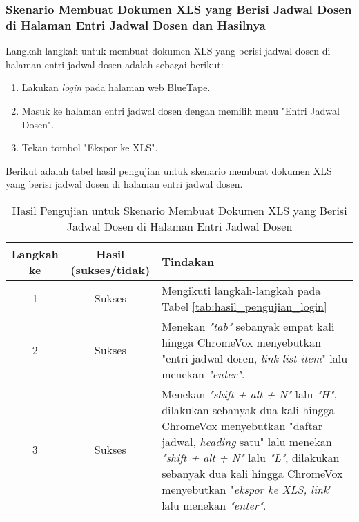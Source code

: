 \subsubsection{Skenario Membuat Dokumen XLS yang Berisi Jadwal Dosen di Halaman Entri Jadwal Dosen dan Hasilnya}
\label{subsubsec:skenario_membuat_dokumen_xls_yang_berisi_jadwal_dosen_di_halaman_entri_jadwal_dosen}
Langkah-langkah untuk membuat dokumen XLS yang berisi jadwal dosen di halaman entri jadwal dosen adalah sebagai berikut:

\begin{enumerate}
    \item Lakukan \textit{login} pada halaman web BlueTape.
    \item Masuk ke halaman entri jadwal dosen dengan memilih menu "Entri Jadwal Dosen".
    \item Tekan tombol "Ekspor ke XLS".
\end{enumerate}

Berikut adalah tabel hasil pengujian untuk skenario membuat dokumen XLS yang berisi jadwal dosen di halaman entri jadwal dosen.

\begin{table}[H]
    \centering 
    \caption{Hasil Pengujian untuk Skenario Membuat Dokumen XLS yang Berisi Jadwal Dosen di Halaman Entri Jadwal Dosen}
    \label{tab:hasil_pengujian_membuat_dokumen_xls_yang_berisi_jadwal_dosen_di_halaman_entri_jadwal_dosen}
    \begin{tabular}{|c|c|p{10cm}|}
        \toprule
        Langkah ke & Hasil (sukses/tidak) & Tindakan \\

        \midrule
        1 & Sukses & Mengikuti langkah-langkah pada Tabel \ref{tab:hasil_pengujian_login} \\
        2 & Sukses & Menekan \textit{"tab"} sebanyak empat kali hingga ChromeVox menyebutkan "entri jadwal dosen, \textit{link list item}" lalu menekan \textit{"enter"}. \\
        3 & Sukses & Menekan \textit{"shift + alt + N"} lalu \textit{"H"}, dilakukan sebanyak dua kali hingga ChromeVox menyebutkan "daftar jadwal, \textit{heading} satu" lalu menekan \textit{"shift + alt + N"} lalu \textit{"L"}, dilakukan sebanyak dua kali hingga ChromeVox menyebutkan "\textit{ekspor ke XLS, link}" lalu menekan \textit{"enter"}. \\

        \bottomrule

    \end{tabular}
\end{table}

